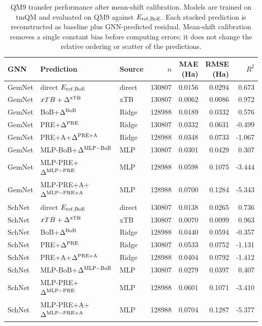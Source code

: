 \documentclass[11pt]{article}
\begin{document}
\begin{table}[H]
  \centering
  \scriptsize
  \setlength{\tabcolsep}{4pt}
  \caption{QM9 transfer performance after mean-shift calibration. Models are trained on tmQM and evaluated on QM9 against \(E_{\rm ref,BoE}\). Each stacked prediction is reconstructed as baseline plus GNN-predicted residual. Mean-shift calibration removes a single constant bias before computing errors; it does not change the relative ordering or scatter of the predictions.}
  \label{tab:qm9-transfer-mean-shift}
  \begin{tabular}{lllrrrr}
    \toprule
    GNN &
    Prediction &
    Source &
    \(n\) &
    \shortstack{MAE\\(Ha)} &
    \shortstack{RMSE\\(Ha)} &
    \(R^2\) \\
    \midrule
    GemNet & direct \(E_{\rm ref,BoE}\) & direct & 130807 & 0.0156 & 0.0294 & 0.673 \\
    GemNet & \(xTB+\Delta^{\rm xTB}\) & xTB & 130807 & 0.0062 & 0.0086 & 0.972 \\
    GemNet & BoB+\(\Delta^{\rm BoB}\) & Ridge & 128988 & 0.0189 & 0.0332 & 0.576 \\
    GemNet & PRE+\(\Delta^{\rm PRE}\) & Ridge & 130807 & 0.0332 & 0.0631 & -0.499 \\
    GemNet & PRE+A+\(\Delta^{\rm PRE+A}\) & Ridge & 128988 & 0.0348 & 0.0733 & -1.067 \\
    GemNet & MLP-BoB+\(\Delta^{\rm MLP-BoB}\) & MLP & 130807 & 0.0301 & 0.0429 & 0.307 \\
    GemNet & MLP-PRE+\(\Delta^{\rm MLP-PRE}\) & MLP & 128988 & 0.0598 & 0.1075 & -3.444 \\
    GemNet & MLP-PRE+A+\(\Delta^{\rm MLP-PRE+A}\) & MLP & 128988 & 0.0700 & 0.1284 & -5.343 \\
    \midrule
    SchNet & direct \(E_{\rm ref,BoE}\) & direct & 130807 & 0.0138 & 0.0265 & 0.736 \\
    SchNet & \(xTB+\Delta^{\rm xTB}\) & xTB & 130807 & 0.0070 & 0.0099 & 0.963 \\
    SchNet & BoB+\(\Delta^{\rm BoB}\) & Ridge & 128988 & 0.0440 & 0.0594 & -0.357 \\
    SchNet & PRE+\(\Delta^{\rm PRE}\) & Ridge & 130807 & 0.0533 & 0.0752 & -1.131 \\
    SchNet & PRE+A+\(\Delta^{\rm PRE+A}\) & Ridge & 128988 & 0.0404 & 0.0792 & -1.412 \\
    SchNet & MLP-BoB+\(\Delta^{\rm MLP-BoB}\) & MLP & 130807 & 0.0279 & 0.0397 & 0.407 \\
    SchNet & MLP-PRE+\(\Delta^{\rm MLP-PRE}\) & MLP & 128988 & 0.0601 & 0.1071 & -3.410 \\
    SchNet & MLP-PRE+A+\(\Delta^{\rm MLP-PRE+A}\) & MLP & 128988 & 0.0704 & 0.1287 & -5.377 \\
    \bottomrule
  \end{tabular}
\end{table}
\end{document}
